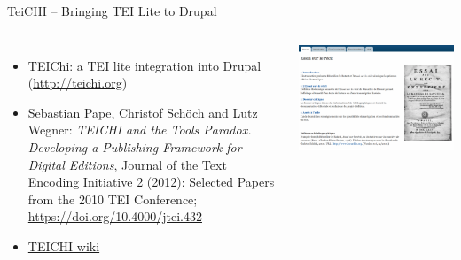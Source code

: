 \begin{frame}{TeiCHI – Bringing TEI Lite to Drupal}


\begin{columns}
\begin{itemize}\scriptsize
    \item TEIChi: a TEI lite integration into Drupal (\protect\url{http://teichi.org})
    \item Sebastian Pape, Christof Schöch and Lutz Wegner: \emph{TEICHI and the Tools Paradox. Developing a Publishing Framework for Digital Editions}, Journal of the Text Encoding Initiative 2 (2012): Selected Papers from the 2010 TEI Conference; \protect\url{https://doi.org/10.4000/jtei.432}
    \item \href{https://wiki.tei-c.org/index.php/TEICHI}{TEICHI wiki}
\end{itemize}
\includegraphics[width=\textwidth]{img/teichi-example.png}
\end{columns}



\end{frame}


